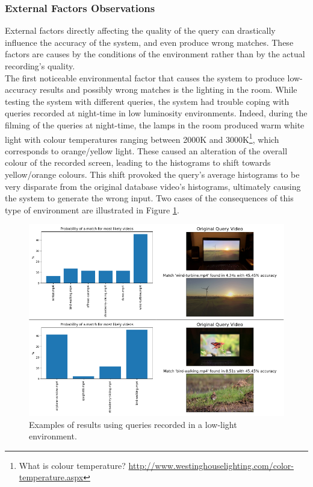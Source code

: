 
\subsubsection{External Factors Observations}
\label{sec:evaluation-observations-online-phase}

External factors directly affecting the quality of the query can drastically influence the accuracy of the system, and even produce wrong matches. These factors are causes by the conditions of the environment rather than by the actual recording's quality.\\

The first noticeable environmental factor that causes the system to produce low-accuracy results and possibly wrong matches is the lighting in the room. While testing the system with different queries, the system had trouble coping with queries recorded at night-time in low luminosity environments. Indeed, during the filming of the queries at night-time, the lamps in the room produced warm white light with colour temperatures ranging between 2000K and 3000K\footnote{What is colour temperature? \url{http://www.westinghouselighting.com/color-temperature.aspx}}, which corresponds to orange/yellow light. These caused an alteration of the overall colour of the recorded screen, leading to the histograms to shift towards yellow/orange colours. This shift provoked the query's average histograms to be very disparate from the original database video's histograms, ultimately causing the system to generate the wrong input. Two cases of the consequences of this type of environment are illustrated in Figure \ref{fig:evaluation-yellow-light-queries}.\\ %

\begin{figure}[h] 
\centerline{\includegraphics[width=\textwidth]{figures/evaluation/yellow-light-queries.png}}
\caption{\label{fig:evaluation-yellow-light-queries}Examples of results using queries recorded in a low-light environment.}
\end{figure}

